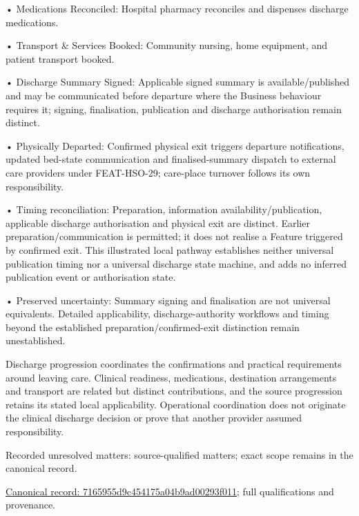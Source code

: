 •
Medications Reconciled: Hospital pharmacy reconciles and dispenses discharge medications.



•
Transport \& Services Booked: Community nursing, home equipment, and patient transport booked.



•
Discharge Summary Signed: Applicable signed summary is available/published and may be communicated before departure where the Business behaviour requires it; signing, finalisation, publication and discharge authorisation remain distinct.



•
Physically Departed: Confirmed physical exit triggers departure notifications, updated bed-state communication and finalised-summary dispatch to external care providers under FEAT-HSO-29; care-place turnover follows its own responsibility.



•
Timing reconciliation: Preparation, information availability/publication, applicable discharge authorisation and physical exit are distinct. Earlier preparation/communication is permitted; it does not realise a Feature triggered by confirmed exit. This illustrated local pathway establishes neither universal publication timing nor a universal discharge state machine, and adds no inferred publication event or authorisation state.



•
Preserved uncertainty: Summary signing and finalisation are not universal equivalents. Detailed applicability, discharge-authority workflows and timing beyond the established preparation/confirmed-exit distinction remain unestablished.



Discharge progression coordinates the confirmations and practical requirements around leaving care. Clinical readiness, medications, destination arrangements and transport are related but distinct contributions, and the source progression retains its stated local applicability. Operational coordination does not originate the clinical discharge decision or prove that another provider assumed responsibility.


{\small Recorded unresolved matters: source-qualified matters; exact scope remains in the canonical record.}\par
{\footnotesize \href{../../../../../../../continuum/business/business-process/7165955d9c454175a04b9ad00293f011.md}{Canonical record: 7165955d9c454175a04b9ad00293f011}; full qualifications and provenance.}\par
